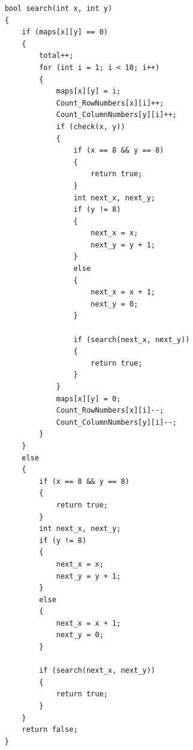 \documentclass[a4paper, 11pt]{article}
\begin{document}
\begin{lstlisting}
    bool search(int x, int y)
    {
        if (maps[x][y] == 0)
        {
        	total++;
            for (int i = 1; i < 10; i++)
            {
                maps[x][y] = i;
                Count_RowNumbers[x][i]++;
                Count_ColumnNumbers[y][i]++;
                if (check(x, y))
                {
                    if (x == 8 && y == 8)
                    {
                        return true;
                    }
                    int next_x, next_y;
                    if (y != 8)
                    {
                        next_x = x;
                        next_y = y + 1;
                    }
                    else
                    {
                        next_x = x + 1;
                        next_y = 0;
                    }

                    if (search(next_x, next_y))
                    {
                        return true;
                    }
                }
                maps[x][y] = 0;
                Count_RowNumbers[x][i]--;
                Count_ColumnNumbers[y][i]--;
            }
        }
        else
        {
            if (x == 8 && y == 8)
            {
                return true;
            }
            int next_x, next_y;
            if (y != 8)
            {
                next_x = x;
                next_y = y + 1;
            }
            else
            {
                next_x = x + 1;
                next_y = 0;
            }

            if (search(next_x, next_y))
            {
                return true;
            }
        }
        return false;
    }


\end{lstlisting}
\end{document}
